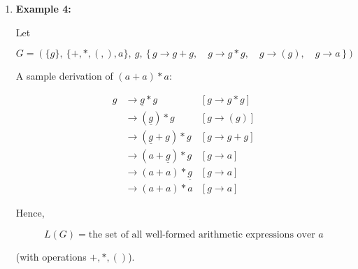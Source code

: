 \documentclass[12pt,a4paper,openany]{article}
\begin{document}
\begin{enumerate}
\[
\begin{aligned}
f &\to \underline{f}f         & [f \to ff] \\
              &\to (\underline{f})f       & [f \to (f)] \\
              &\to ()f                    & [f \to \varepsilon] \\
              &\to ()(\underline{f})      & [f \to (f)] \\
              &\to ()()                   & [f \to \varepsilon]
\end{aligned}
\]

A sample derivation of \(((()()))\):

\[
\begin{aligned}
f &\to (\underline{f})          & [f \to (f)] \\
              &\to ((\underline{f}))        & [f \to (f)] \\
              &\to ((\underline{f}f))       & [f \to ff] \\
              &\to ((()\underline{f}))      & [f \to (f)] \\
              &\to ((()()) )                & [f \to (f), \ \text{then} \ f \to \varepsilon] \\
              &\to ((()()))                 & [f \to \varepsilon]
\end{aligned}
\]

Therefore,

\[
\boxed{L(G)=\text{all balanced parentheses strings}}.
\]

\item \textbf{Example 4:}

Let

\[
G = (\{g\},\ \{+,*,(,),a\},\ g,\ \{\, g \to g + g,\quad g \to g * g,\quad g \to (g),\quad g \to a \,\})
\]

\noindent
A sample derivation of \((a+a)*a\):

\[
\begin{aligned}
g &\to \underline{g} * g        & [g \to g * g] \\
              &\to (\underline{g}) * g      & [g \to (g)] \\
              &\to (\underline{g} + g) * g  & [g \to g + g] \\
              &\to (a + \underline{g}) * g  & [g \to a] \\
              &\to (a + a) * \underline{g}  & [g \to a] \\
              &\to (a + a) * a              & [g \to a]
\end{aligned}
\]

Hence,

\[
\boxed{L(G)=\text{the set of all well-formed arithmetic expressions over } a}
\]

(with operations \(+,*,()\)).

\end{enumerate}
\end{document}
